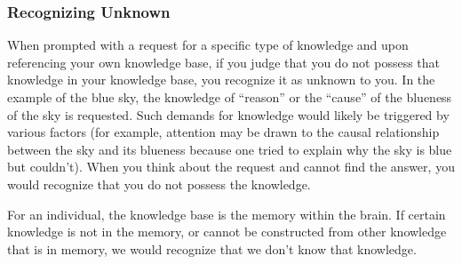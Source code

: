 \subsubsection{Recognizing Unknown}
When prompted with a request for a specific type of knowledge and upon referencing your own knowledge base, if you judge that you do not possess that knowledge in your knowledge base, you recognize it as unknown to you. In the example of the blue sky, the knowledge of ``reason'' or the ``cause'' of the blueness of the sky is requested. Such demands for knowledge would likely be triggered by various factors (for example, attention may be drawn to the causal relationship between the sky and its blueness because one tried to explain why the sky is blue but couldn't). When you think about the request and cannot find the answer, you would recognize that you do not possess the knowledge. 


For an individual, the knowledge base is the memory within the brain. If certain knowledge is not in the memory, or cannot be constructed from other knowledge that is in memory, we would recognize that we don't know that knowledge. 



